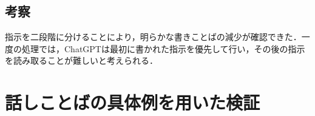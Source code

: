 \subsection{考察}
指示を二段階に分けることにより，明らかな書きことばの減少が確認できた．一度の処理では，ChatGPTは最初に書かれた指示を優先して行い，その後の指示を読み取ることが難しいと考えられる．

\section{話しことばの具体例を用いた検証}
\section{}

